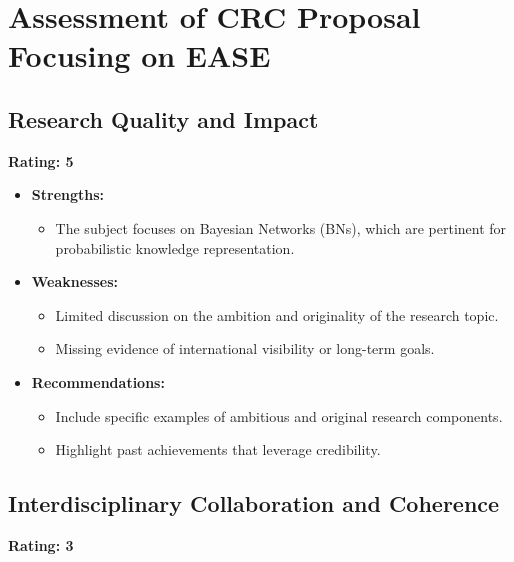 \documentclass{article}
\begin{document}
\section{Assessment of CRC Proposal Focusing on EASE}

\subsection{Research Quality and Impact}

\textbf{Rating: 5}

\begin{itemize}
    \item \textbf{Strengths:}
    \begin{itemize}
        \item The subject focuses on Bayesian Networks (BNs), which are pertinent for probabilistic knowledge representation.
    \end{itemize}
    \item \textbf{Weaknesses:}
    \begin{itemize}
        \item Limited discussion on the ambition and originality of the research topic.
        \item Missing evidence of international visibility or long-term goals.
    \end{itemize}
    \item \textbf{Recommendations:}
    \begin{itemize}
        \item Include specific examples of ambitious and original research components.
        \item Highlight past achievements that leverage credibility.
    \end{itemize}
\end{itemize}

\subsection{Interdisciplinary Collaboration and Coherence}

\textbf{Rating: 3}
\end{document}

